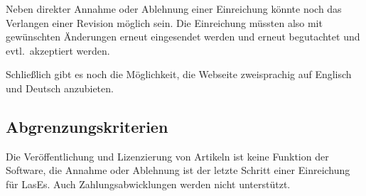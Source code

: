 Neben direkter Annahme oder Ablehnung einer Einreichung könnte noch das Verlangen einer Revision möglich sein.
Die Einreichung müssten also mit gewünschten Änderungen erneut eingesendet werden und erneut begutachtet und evtl.\ akzeptiert werden.

Schließlich gibt es noch die Möglichkeit, die Webseite zweisprachig auf Englisch und Deutsch anzubieten.

\subsection{Abgrenzungskriterien}

Die Veröffentlichung und Lizenzierung von Artikeln ist keine Funktion der Software, die Annahme oder Ablehnung ist der letzte Schritt einer Einreichung für LasEs. Auch Zahlungsabwicklungen werden nicht unterstützt.